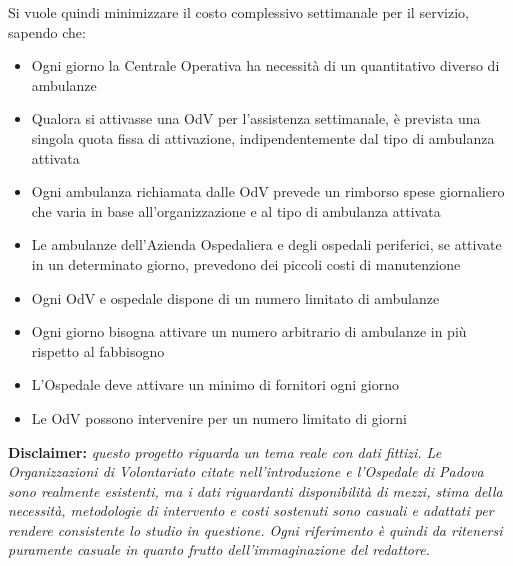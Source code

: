 \newline \newline
Si vuole quindi minimizzare il costo complessivo settimanale per il servizio, sapendo che:
\begin{itemize}
    \item Ogni giorno la Centrale Operativa ha necessità di un quantitativo diverso di ambulanze
    \item Qualora si attivasse una OdV per l'assistenza settimanale, è prevista una singola quota fissa di attivazione, indipendentemente dal tipo di ambulanza attivata
    \item Ogni ambulanza richiamata dalle OdV prevede un rimborso spese giornaliero che varia in base all'organizzazione e al tipo di ambulanza attivata
    \item Le ambulanze dell'Azienda Ospedaliera e degli ospedali periferici, se attivate in un determinato giorno, prevedono dei piccoli costi di manutenzione
    \item Ogni OdV e ospedale dispone di un numero limitato di ambulanze
    \item Ogni giorno bisogna attivare un numero arbitrario di ambulanze in più rispetto al fabbisogno
    \item L'Ospedale deve attivare un minimo di fornitori ogni giorno
    \item Le OdV possono intervenire per un numero limitato di giorni
\end{itemize}
\textbf{Disclaimer: } \textit{questo progetto riguarda un tema reale con dati fittizi. Le Organizzazioni di Volontariato citate nell'introduzione e l'Ospedale di Padova sono realmente esistenti, ma i dati riguardanti disponibilità di mezzi, stima della necessità, metodologie di intervento e costi sostenuti sono casuali e adattati per rendere consistente lo studio in questione. Ogni riferimento è quindi da ritenersi puramente casuale in quanto frutto dell'immaginazione del redattore.}